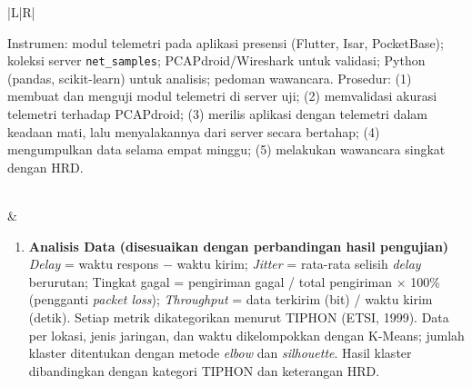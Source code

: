 \documentclass[11pt,a4paper]{article}
\begin{document}
\begin{longtable}{|L|R|}
\begin{enumerate}[label=\arabic*.,start=3]
Instrumen: modul telemetri pada aplikasi presensi (Flutter, Isar, PocketBase); koleksi server \texttt{net\_samples}; PCAPdroid/Wireshark untuk validasi; Python (pandas, scikit-learn) untuk analisis; pedoman wawancara.\newline
Prosedur:\newline
(1) membuat dan menguji modul telemetri di server uji;\newline
(2) memvalidasi akurasi telemetri terhadap PCAPdroid;\newline
(3) merilis aplikasi dengan telemetri dalam keadaan mati, lalu menyalakannya dari server secara bertahap;\newline
(4) mengumpulkan data selama empat minggu;\newline
(5) melakukan wawancara singkat dengan HRD.
\end{enumerate}
\\
&
\begin{enumerate}[label=\arabic*.,start=4]
\item \textbf{Analisis Data (disesuaikan dengan perbandingan hasil pengujian)}\newline
\textit{Delay} = waktu respons − waktu kirim; \textit{Jitter} = rata-rata selisih \textit{delay} berurutan; Tingkat gagal = pengiriman gagal / total pengiriman × 100\% (pengganti \textit{packet loss}); \textit{Throughput} = data terkirim (bit) / waktu kirim (detik). Setiap metrik dikategorikan menurut TIPHON (ETSI, 1999). Data per lokasi, jenis jaringan, dan waktu dikelompokkan dengan K-Means; jumlah klaster ditentukan dengan metode \textit{elbow} dan \textit{silhouette}. Hasil klaster dibandingkan dengan kategori TIPHON dan keterangan HRD.
\end{enumerate}
\\ \hline


\end{longtable}
\end{document}
